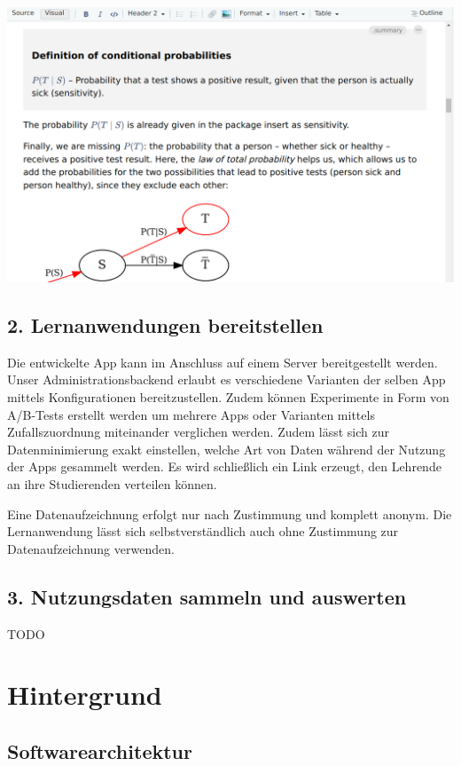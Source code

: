 \documentclass[a0,portrait]{a0poster}
\begin{document}
\begin{multicols}{2}
\begin{center}\vspace{1cm}
\includegraphics[width=0.6\linewidth]{at-visual-smaller}
\end{center}\vspace{1cm}

\subsection*{2. Lernanwendungen bereitstellen}

Die entwickelte App kann im Anschluss auf einem Server bereitgestellt werden. Unser Administrationsbackend erlaubt es verschiedene Varianten der selben App mittels Konfigurationen bereitzustellen. Zudem können Experimente in Form von A/B-Tests erstellt werden um mehrere Apps oder Varianten mittels Zufallszuordnung miteinander verglichen werden. Zudem lässt sich zur Datenminimierung exakt einstellen, welche Art von Daten während der Nutzung der Apps gesammelt werden. Es wird schließlich ein Link erzeugt, den Lehrende an ihre Studierenden verteilen können.

Eine Datenaufzeichnung erfolgt nur nach Zustimmung und komplett anonym. Die Lernanwendung lässt sich selbstverständlich auch ohne Zustimmung zur Datenaufzeichnung verwenden.


\subsection*{3. Nutzungsdaten sammeln und auswerten}

TODO

\section*{Hintergrund}

\subsection*{Softwarearchitektur}


\end{multicols}
\end{document}

